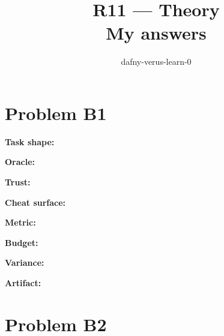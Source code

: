 \documentclass[11pt]{article}
\title{R11 --- Theory \\ \large My answers}
\author{dafny-verus-learn-0}
\date{}
\begin{document}
\maketitle
\section*{Problem B1}\label{ans:B1}
\begin{answer}
\textbf{Task shape:} \vspace{1.3cm}

\textbf{Oracle:} \vspace{1.3cm}

\textbf{Trust:} \vspace{1.3cm}

\textbf{Cheat surface:} \vspace{1.3cm}

\textbf{Metric:} \vspace{1.3cm}

\textbf{Budget:} \vspace{1.3cm}

\textbf{Variance:} \vspace{1.3cm}

\textbf{Artifact:} \vspace{1.3cm}
\end{answer}
\section*{Problem B2}\label{ans:B2}
\begin{answer}\vspace{10cm}\end{answer}
\end{document}
